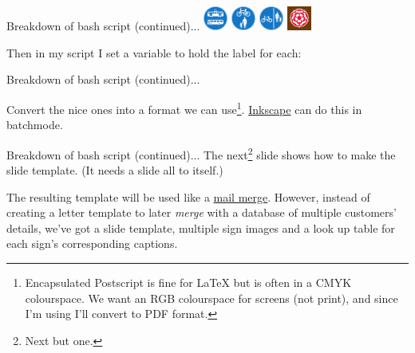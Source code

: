 \begin{frame}{Breakdown of bash script (continued)...}
{\includegraphics[width=0.06\textwidth]{Motivation/Signs/953.1V}
\includegraphics[width=0.06\textwidth]{Motivation/Signs/956}
\includegraphics[width=0.06\textwidth]{Motivation/Signs/957}
\includegraphics[width=0.06\textwidth]{Motivation/Signs/T201}
}

\parbox{\textwidth}{\small Then in my script I set a variable to hold the label for each:}

\tiny

\end{frame}

\begin{frame}{Breakdown of bash script (continued)...}
\parbox{\textwidth}{Convert the nice ones into a format we can use\footnote{Encapsulated Postscript is fine for \LaTeX{} but is often in a CMYK colourspace. We want an RGB colourspace for screens (not print), and since I'm using  I'll convert to PDF format.}. \href{https://inkscape.org/}{Inkscape} can do this in batchmode.}
\tiny

\end{frame}

\begin{frame}{Breakdown of bash script (continued)...}
The next\footnote{Next but one.} slide shows how to make the slide template. (It needs a slide all to itself.)

The resulting template will be used like a \href{https://en.wikipedia.org/wiki/Mail_merge}{mail merge}. However, instead of creating a letter template to later \emph{merge} with a database of multiple customers' details, we've got a slide template, multiple sign images and a look up table for each sign's corresponding captions.
\end{frame}

{
}

